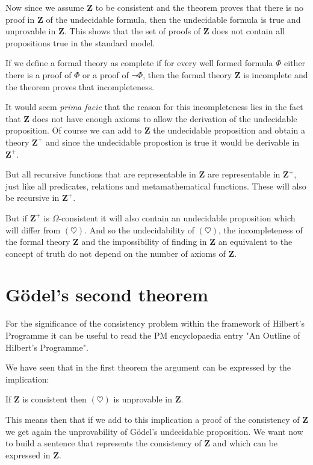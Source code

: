\documentclass[12pt]{article}
\begin{document}
Now since we assume $\textbf{Z}$ to be consistent and the theorem proves that there is no proof in $\textbf{Z}$ of the undecidable formula, then the undecidable formula is true and unprovable in $\textbf{Z}$. This shows that the set of proofs of $\textbf{Z}$ does not contain all propositions true in the standard model.

If we define a formal theory as complete if for every well formed formula $\Phi$ either there is a proof of $\Phi$ or a proof of $\neg \Phi$, then the formal theory $\textbf{Z}$ is incomplete and the theorem proves that incompleteness. 

It would seem \emph{prima facie} that the reason for this incompleteness lies in the fact that $\textbf{Z}$ does not have enough axioms to allow the derivation of the undecidable proposition. Of course  we can add to $\textbf{Z}$ the undecidable proposition and obtain a theory $\textbf{Z}^{+}$ and since the undecidable propostion is true it would be derivable in $\textbf{Z}^{+}$.

But all recursive functions that are representable in $\textbf{Z}$ are representable in $\textbf{Z}^{+}$, just like all predicates, relations and metamathematical functions. These will also be recursive in $\textbf{Z}^{+}$.

But if $\textbf{Z}^{+}$ is $\Omega$-consistent it will also contain an undecidable proposition which will differ from $(\heartsuit)$. And so the undecidability of $(\heartsuit)$, the incompleteness of the formal theory $\textbf{Z}$ and the impossibility of finding in $\textbf{Z}$ an equivalent to the concept of truth do not depend on the number of axioms of $\textbf{Z}$.

\section{G\"{o}del's second theorem}\normalsize

For the significance of the consistency problem within the framework of Hilbert's Programme it can be useful to read  the PM encyclopaedia  entry "An Outline of Hilbert's Programme".

We have seen that in the first theorem the argument can be expressed by the implication:

\begin{center}
If $\textbf{Z}$ is consistent then $(\heartsuit)$ is unprovable in $\textbf{Z}$.
\end{center}

This means then that if we add to this implication a proof of the consistency of $\textbf{Z}$ we get again the unprovability of G\"{o}del's undecidable proposition. We want now to build a sentence that represents the consistency of $\textbf{Z}$ and which can be expressed in $\textbf{Z}$.
\end{document}
